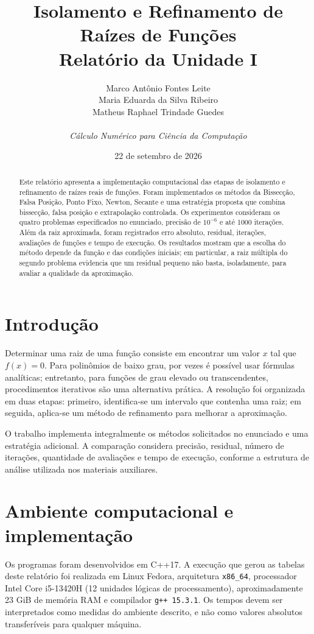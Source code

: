 \documentclass[12pt,a4paper]{article}
\title{\textbf{Isolamento e Refinamento de Raízes de Funções}\\
\large Relatório da Unidade I}
\author{\begin{tabular}{c}
Marco Antônio Fontes Leite\\
Maria Eduarda da Silva Ribeiro\\
Matheus Raphael Trindade Guedes
\end{tabular}\\[0.5cm]
\textit{Cálculo Numérico para Ciência da Computação}}
\date{22 de setembro de 2026}
\begin{document}
\maketitle

\begin{abstract}
Este relatório apresenta a implementação computacional das etapas de isolamento e refinamento de raízes reais de funções. Foram implementados os métodos da Bissecção, Falsa Posição, Ponto Fixo, Newton, Secante e uma estratégia proposta que combina bissecção, falsa posição e extrapolação controlada. Os experimentos consideram os quatro problemas especificados no enunciado, precisão de $10^{-6}$ e até 1000 iterações. Além da raiz aproximada, foram registrados erro absoluto, residual, iterações, avaliações de funções e tempo de execução. Os resultados mostram que a escolha do método depende da função e das condições iniciais; em particular, a raiz múltipla do segundo problema evidencia que um residual pequeno não basta, isoladamente, para avaliar a qualidade da aproximação.
\end{abstract}

\section{Introdução}

Determinar uma raiz de uma função consiste em encontrar um valor $x$ tal que $f(x)=0$. Para polinômios de baixo grau, por vezes é possível usar fórmulas analíticas; entretanto, para funções de grau elevado ou transcendentes, procedimentos iterativos são uma alternativa prática. A resolução foi organizada em duas etapas: primeiro, identifica-se um intervalo que contenha uma raiz; em seguida, aplica-se um método de refinamento para melhorar a aproximação.

O trabalho implementa integralmente os métodos solicitados no enunciado e uma estratégia adicional. A comparação considera precisão, residual, número de iterações, quantidade de avaliações e tempo de execução, conforme a estrutura de análise utilizada nos materiais auxiliares.

\section{Ambiente computacional e implementação}

Os programas foram desenvolvidos em C++17. A execução que gerou as tabelas deste relatório foi realizada em Linux Fedora, arquitetura \texttt{x86\_64}, processador Intel Core i5-13420H (12 unidades lógicas de processamento), aproximadamente 23 GiB de memória RAM e compilador \texttt{g++ 15.3.1}. Os tempos devem ser interpretados como medidas do ambiente descrito, e não como valores absolutos transferíveis para qualquer máquina.
\end{document}
